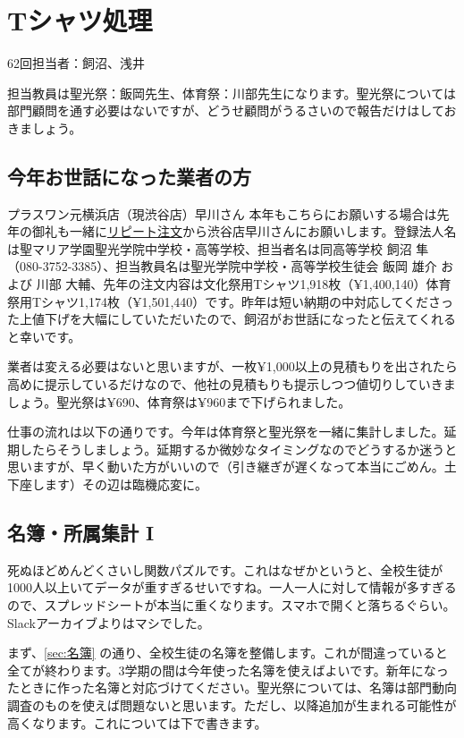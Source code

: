 \documentclass[dvipdfmx,jb5]{jreport}
\newcommand{\link}[2]{\href{#2}{#1}}
\begin{document}
\section{Tシャツ処理}
62回担当者：飼沼、浅井

担当教員は聖光祭：飯岡先生、体育祭：川部先生になります。聖光祭については部門顧問を通す必要はないですが、どうせ顧問がうるさいので報告だけはしておきましょう。

\subsection{今年お世話になった業者の方}
プラスワン元横浜店（現渋谷店）早川さん
本年もこちらにお願いする場合は先年の御礼も一緒に\link{リピート注文}{https://www.p1-intl.com/contents/repeat.html}から渋谷店早川さんにお願いします。登録法人名は聖マリア学園聖光学院中学校・高等学校、担当者名は同高等学校 飼沼 隼（080-3752-3385）、担当教員名は聖光学院中学校・高等学校生徒会 飯岡 雄介 および 川部 大輔、先年の注文内容は文化祭用Tシャツ1,918枚（¥1,400,140）体育祭用Tシャツ1,174枚（¥1,501,440）です。昨年は短い納期の中対応してくださった上値下げを大幅にしていただいたので、飼沼がお世話になったと伝えてくれると幸いです。

業者は変える必要はないと思いますが、一枚¥1,000以上の見積もりを出されたら高めに提示しているだけなので、他社の見積もりも提示しつつ値切りしていきましょう。聖光祭は¥690、体育祭は¥960まで下げられました。

仕事の流れは以下の通りです。今年は体育祭と聖光祭を一緒に集計しました。延期したらそうしましょう。延期するか微妙なタイミングなのでどうするか迷うと思いますが、早く動いた方がいいので（引き継ぎが遅くなって本当にごめん。土下座します）その辺は臨機応変に。

\subsection{名簿・所属集計 I}
死ぬほどめんどくさいし関数パズルです。これはなぜかというと、全校生徒が1000人以上いてデータが重すぎるせいですね。一人一人に対して情報が多すぎるので、スプレッドシートが本当に重くなります。スマホで開くと落ちるぐらい。Slackアーカイブよりはマシでした。

まず、\ref{sec:名簿} の通り、全校生徒の名簿を整備します。これが間違っていると全てが終わります。3学期の間は今年使った名簿を使えばよいです。新年になったときに作った名簿と対応づけてください。聖光祭については、名簿は部門動向調査のものを使えば問題ないと思います。ただし、以降追加が生まれる可能性が高くなります。これについては下で書きます。
\end{document}
